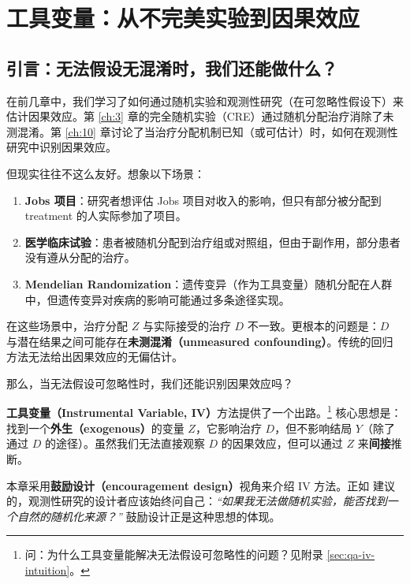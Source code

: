 
\chapter{工具变量：从不完美实验到因果效应}
\label{ch:21}

\section{引言：无法假设无混淆时，我们还能做什么？}

在前几章中，我们学习了如何通过随机实验和观测性研究（在可忽略性假设下）来估计因果效应。第 \ref{ch:3} 章的完全随机实验（CRE）通过随机分配治疗消除了未测混淆。第 \ref{ch:10} 章讨论了当治疗分配机制已知（或可估计）时，如何在观测性研究中识别因果效应。

但现实往往不这么友好。想象以下场景：

\begin{enumerate}
  \item \textbf{Jobs 项目}：研究者想评估 Jobs 项目对收入的影响，但只有部分被分配到 treatment 的人实际参加了项目。
  \item \textbf{医学临床试验}：患者被随机分配到治疗组或对照组，但由于副作用，部分患者没有遵从分配的治疗。
  \item \textbf{Mendelian Randomization}：遗传变异（作为工具变量）随机分配在人群中，但遗传变异对疾病的影响可能通过多条途径实现。
\end{enumerate}

在这些场景中，治疗分配 $Z$ 与实际接受的治疗 $D$ 不一致。更根本的问题是：$D$ 与潜在结果之间可能存在\textbf{未测混淆（unmeasured confounding）}。传统的回归方法无法给出因果效应的无偏估计。

那么，当无法假设可忽略性时，我们还能识别因果效应吗？

\textbf{工具变量（Instrumental Variable, IV）}方法提供了一个出路。\footnote{问：为什么工具变量能解决无法假设可忽略性的问题？见附录 \cref{sec:qa-iv-intuition}。} 核心思想是：找到一个\textbf{外生（exogenous）}的变量 $Z$，它影响治疗 $D$，但不影响结局 $Y$（除了通过 $D$ 的途径）。虽然我们无法直接观察 $D$ 的因果效应，但可以通过 $Z$ 来\textbf{间接}推断。

本章采用\textbf{鼓励设计（encouragement design）}视角来介绍 IV 方法。正如 \citet{Dorn:1953} 建议的，观测性研究的设计者应该始终问自己：\textit{``如果我无法做随机实验，能否找到一个自然的随机化来源？''} 鼓励设计正是这种思想的体现。

